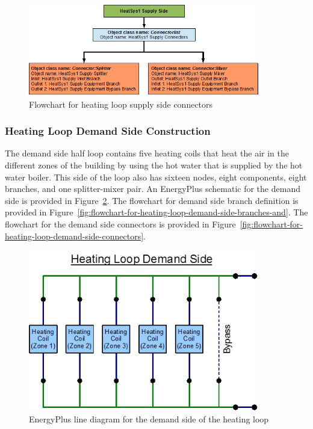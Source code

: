 \begin{figure}[hbtp] %
\centering
\includegraphics[width=0.9\textwidth, height=0.9\textheight, keepaspectratio=true]{media/image079.png}
\caption{Flowchart for heating loop supply side connectors \protect \label{fig:flowchart-for-heating-loop-supply-side-connectors}}
\end{figure}

\subsubsection{Heating Loop Demand Side Construction}\label{heating-loop-demand-side-construction}

The demand side half loop contains five heating coils that heat the air in the different zones of the building by using the hot water that is supplied by the hot water boiler. This side of the loop also has sixteen nodes, eight components, eight branches, and one splitter-mixer pair. An EnergyPlus schematic for the demand side is provided in Figure~\ref{fig:energyplus-line-diagram-for-the-demand-side-004}. The flowchart for demand side branch definition is provided in Figure~\ref{fig:flowchart-for-heating-loop-demand-side-branches-and}. The flowchart for the demand side connectors is provided in Figure~\ref{fig:flowchart-for-heating-loop-demand-side-connectors}.

\begin{figure}[hbtp] %
\centering
\includegraphics[width=0.9\textwidth, height=0.9\textheight, keepaspectratio=true]{media/image080.png}
\caption{EnergyPlus line diagram for the demand side of the heating loop \protect \label{fig:energyplus-line-diagram-for-the-demand-side-004}}
\end{figure}

